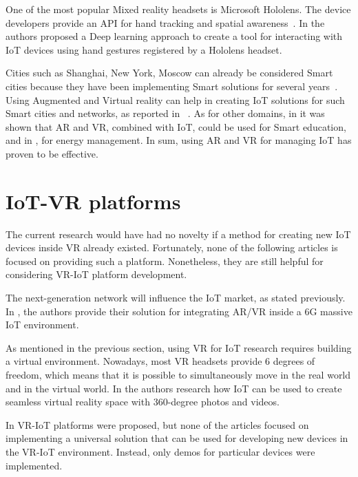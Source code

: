 One of the most popular Mixed reality headsets is Microsoft Hololens. The device developers provide an API for hand tracking and spatial awareness~\cite{MRTK2021}. In \cite{sun_magichand_2019} the authors proposed a Deep learning approach to create a tool for interacting with IoT devices using hand gestures registered by a Hololens headset. 

Cities such as Shanghai, New York, Moscow can already be considered Smart cities because they have been implementing Smart solutions for several years~\cite{vershinina_smart_2016}. Using Augmented and Virtual reality can help in creating IoT solutions for such Smart cities and networks, as reported in ~\cite{chakareski_uav-iot_2019, carneiro_bim_2018}. As for other domains, in \cite{paul_role_2019} it was shown that AR and VR, combined with IoT, could be used for Smart education, and in \cite{jang_building_2019-1}, for energy management. In sum, using AR and VR for managing IoT has proven to be effective.

\section{IoT-VR platforms}

The current research would have had no novelty if a method for creating new IoT devices inside VR already existed. Fortunately, none of the following articles is focused on providing such a platform. Nonetheless, they are still helpful for considering VR-IoT platform development.

The next-generation network will influence the IoT market, as stated previously. In \cite{liao_information-centric_2021}, the authors provide their solution for integrating AR/VR inside a 6G massive IoT environment.

As mentioned in the previous section, using VR for IoT research requires building a virtual environment. Nowadays, most VR headsets provide 6 degrees of freedom, which means that it is possible to simultaneously move in the real world and in the virtual world. In \cite{you_internet_2018} the authors research how IoT can be used to create seamless virtual reality space with 360-degree photos and videos.

In \cite{myeong-in_choi_design_2017, simiscuka_synchronisation_2018, simiscuka_real-virtual_2019, krishnan_performance_2020} VR-IoT platforms were proposed, but none of the articles focused on implementing a universal solution that can be used for developing new devices in the VR-IoT environment. Instead, only demos for particular devices were implemented.

